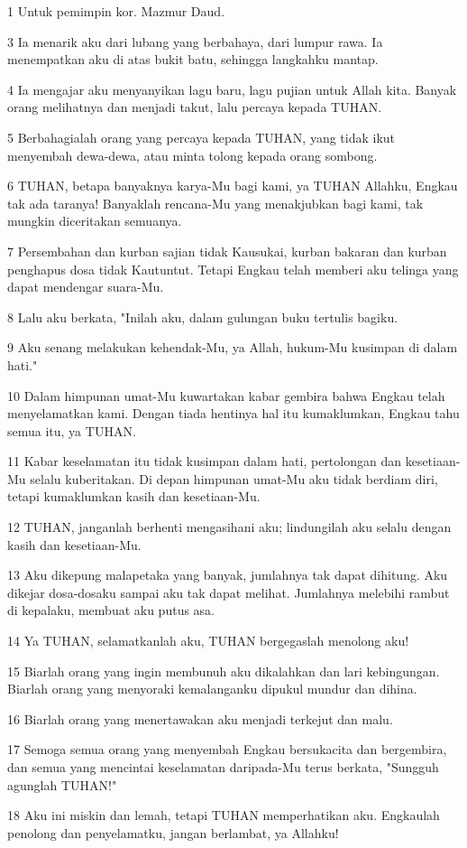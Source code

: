 \par 1 Untuk pemimpin kor. Mazmur Daud.
\par 3 Ia menarik aku dari lubang yang berbahaya, dari lumpur rawa. Ia menempatkan aku di atas bukit batu, sehingga langkahku mantap.
\par 4 Ia mengajar aku menyanyikan lagu baru, lagu pujian untuk Allah kita. Banyak orang melihatnya dan menjadi takut, lalu percaya kepada TUHAN.
\par 5 Berbahagialah orang yang percaya kepada TUHAN, yang tidak ikut menyembah dewa-dewa, atau minta tolong kepada orang sombong.
\par 6 TUHAN, betapa banyaknya karya-Mu bagi kami, ya TUHAN Allahku, Engkau tak ada taranya! Banyaklah rencana-Mu yang menakjubkan bagi kami, tak mungkin diceritakan semuanya.
\par 7 Persembahan dan kurban sajian tidak Kausukai, kurban bakaran dan kurban penghapus dosa tidak Kautuntut. Tetapi Engkau telah memberi aku telinga yang dapat mendengar suara-Mu.
\par 8 Lalu aku berkata, "Inilah aku, dalam gulungan buku tertulis bagiku.
\par 9 Aku senang melakukan kehendak-Mu, ya Allah, hukum-Mu kusimpan di dalam hati."
\par 10 Dalam himpunan umat-Mu kuwartakan kabar gembira bahwa Engkau telah menyelamatkan kami. Dengan tiada hentinya hal itu kumaklumkan, Engkau tahu semua itu, ya TUHAN.
\par 11 Kabar keselamatan itu tidak kusimpan dalam hati, pertolongan dan kesetiaan-Mu selalu kuberitakan. Di depan himpunan umat-Mu aku tidak berdiam diri, tetapi kumaklumkan kasih dan kesetiaan-Mu.
\par 12 TUHAN, janganlah berhenti mengasihani aku; lindungilah aku selalu dengan kasih dan kesetiaan-Mu.
\par 13 Aku dikepung malapetaka yang banyak, jumlahnya tak dapat dihitung. Aku dikejar dosa-dosaku sampai aku tak dapat melihat. Jumlahnya melebihi rambut di kepalaku, membuat aku putus asa.
\par 14 Ya TUHAN, selamatkanlah aku, TUHAN bergegaslah menolong aku!
\par 15 Biarlah orang yang ingin membunuh aku dikalahkan dan lari kebingungan. Biarlah orang yang menyoraki kemalanganku dipukul mundur dan dihina.
\par 16 Biarlah orang yang menertawakan aku menjadi terkejut dan malu.
\par 17 Semoga semua orang yang menyembah Engkau bersukacita dan bergembira, dan semua yang mencintai keselamatan daripada-Mu terus berkata, "Sungguh agunglah TUHAN!"
\par 18 Aku ini miskin dan lemah, tetapi TUHAN memperhatikan aku. Engkaulah penolong dan penyelamatku, jangan berlambat, ya Allahku!


